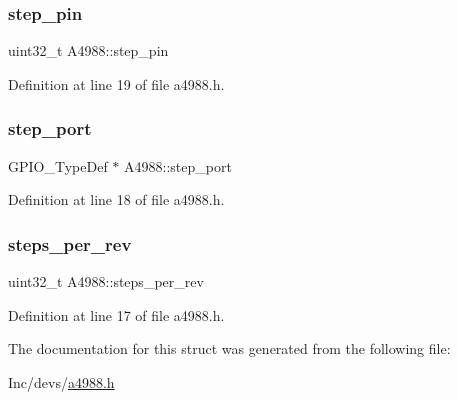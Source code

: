 \subsubsection{\texorpdfstring{step\_pin}{step\_pin}}
{\footnotesize\ttfamily uint32\+\_\+t A4988\+::step\+\_\+pin}



Definition at line 19 of file a4988.\+h.

\mbox{\label{struct_a4988_ab5092f4f2504a071d77995f9713ab36d}} 
\subsubsection{\texorpdfstring{step\_port}{step\_port}}
{\footnotesize\ttfamily G\+P\+I\+O\+\_\+\+Type\+Def $\ast$ A4988\+::step\+\_\+port}



Definition at line 18 of file a4988.\+h.

\mbox{\label{struct_a4988_a0453d56f7e20c45a4140e4af29f1c628}} 
\subsubsection{\texorpdfstring{steps\_per\_rev}{steps\_per\_rev}}
{\footnotesize\ttfamily uint32\+\_\+t A4988\+::steps\+\_\+per\+\_\+rev}



Definition at line 17 of file a4988.\+h.



The documentation for this struct was generated from the following file\+:\begin{DoxyCompactItemize}
\item 
Inc/devs/\mbox{\hyperlink{a4988_8h}{a4988.\+h}}\end{DoxyCompactItemize}

